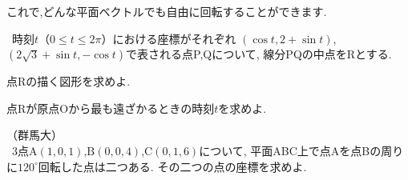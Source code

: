 \documentclass[10pt,fleqn,a4paper]{jsarticle}
\begin{document}
これで,どんな平面ベクトルでも自由に回転することができます.\

\newpage

\noindent{}\
時刻$t$（$0\leq t\leq2\pi$）における座標がそれぞれ
$(\cos t,2+\sin t)$,$(2\sqrt{3}+\sin t,-\cos t)$で表される点P,Qについて,
線分PQの中点をRとする.
\par\noindent\kakkoichi 点Rの描く図形を求めよ.
\par\noindent\kakkoni 点Rが原点Oから最も遠ざかるときの時刻$t$を求めよ.
\par\noindent\hfill（群馬大）\\

\noindent{}\
3点$\mathrm{A}(1,0,1)$,$\mathrm{B}(0,0,4)$,$\mathrm{C}(0,1,6)$について,
平面ABC上で点Aを点Bの周りに$120^\circ$回転した点は二つある.
その二つの点の座標を求めよ.\
\end{document}

